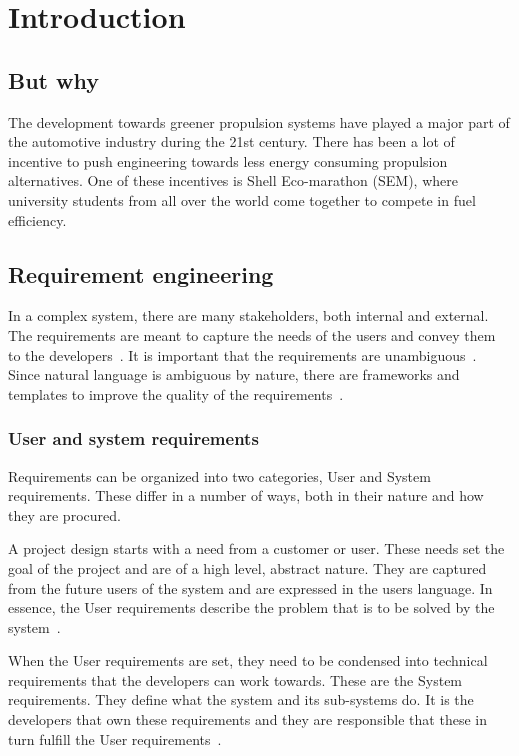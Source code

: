 \chapter{Introduction}
\section{But why}
The development towards greener propulsion systems have played a major part of the automotive industry during the 21st century. There has been a lot of incentive to push engineering towards less energy consuming propulsion alternatives. One of these incentives is Shell Eco-marathon (SEM), where university students from all over the world come together to compete in fuel efficiency.

\section{Requirement engineering}
In a complex system, there are many stakeholders, both internal and external.
The requirements are meant to capture the needs of the users and convey them to
the developers~\cite{ibm_req}. It is important that the requirements are
unambiguous~\cite{ibm_req, rupp2014}. Since natural language is ambiguous by
nature, there are frameworks and templates to improve the quality of the
requirements~\cite{rupp2014}. 

\subsection{User and system requirements}
Requirements can be organized into two categories, User and System requirements.
These differ in a number of ways, both in their nature and how they are
procured.

A project design starts with a need from a customer or user. These needs set the
goal of the project and are of a high level, abstract nature. They are captured
from the future users of the system and are expressed in the users language. In
essence, the User requirements describe the problem that is to be solved by the
system~\cite{ibm_req}. 

When the User requirements are set, they need to be condensed into technical
requirements that the developers can work towards. These are the System
requirements. They define what the system and its sub-systems do. It is the
developers that own these requirements and they are responsible that these in
turn fulfill the User requirements~\cite{ibm_req}.

